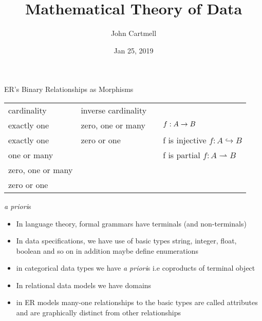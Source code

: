 \documentclass[xcolor=pst,dvips]{beamer}   %
\title[John Cartmell]{Mathematical Theory of Data}
\author{John Cartmell}
\institute{Otium}
\date{Jan 25, 2019}
\begin{document}
\newcommand{\attr}[1]{#1}
\renewcommand{\attr}[1]{\psframebox[linecolor=red,framearc=.1]{#1}}
\newcommand{\attrtype}[1]{#1}
\renewcommand{\attrtype}[1]{\psframebox[linecolor=blue,framearc=.1]{#1}}
\newcommand{\etype}[1]{#1}
\renewcommand{\etype}[1]{\psframebox[linecolor=red,framearc=.1]{#1}}

\newcommand{\CEsymboltype}[0]{varchar(2)}
\newcommand{\CEatomicnumbertype}{number(1,1000)}
\newcommand{\CEfloattype}{float}
\newcommand{\CEnametype}{varchar(64)}
\newcommand{\CEvalencynumbertype}{number(-7,7)}

\begin{frame}
\titlepage
\end{frame}

\iffalse
\AtBeginSubsection[]
{
  \begin{frame}<beamer>
    \frametitle{Layout}
    \tableofcontents[currentsection,currentsubsection]
  \end{frame}
} 
\begin{frame}{Table of Contents}
\tableofcontents
\end{frame}
\fi


\begin{frame}{ER's Binary Relationships as Morphisms}
\footnotesize
\begin{tabular} {l l l l}
cardinality        & inverse cardinality &     &\\
exactly one        & zero, one or many   &     & $f: A \rightarrow B$\\
exactly one        & zero or one         &     & f is injective $f: A \hookrightarrow B$\\
one or many        &                     &     &f is partial $f:A \rightharpoonup B$\\
zero, one or many  &                     &     &\\
zero or one        &                     &     &\\
\end{tabular}
\end{frame}


\begin{frame}{\textit{a priori}s}
\begin{itemize}
\item In language theory, formal grammars have terminals (and non-terminals)
\pause \item In data specifications, we have use of basic types string, integer, float, boolean and so on
              in addition maybe define enumerations 
\pause \item in categorical data types we have \textit{a priori}s i.e coproducts of terminal object
\pause \item In relational data models we have domains
\pause \item in ER models many-one relationships to the basic types are called attributes and are graphically distinct from other relationships
\end{itemize}
\end{frame}
\end{document}
